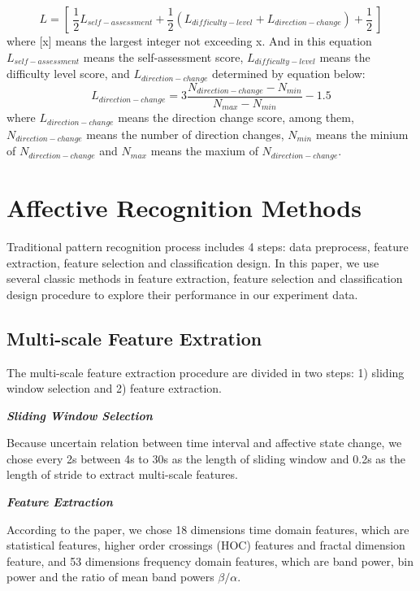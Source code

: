 \documentclass[runningheads,a4paper]{llncs}
\begin{document}
\begin{equation}
  L =  [\ \frac{1}{2}L_{self-assessment} +
      \frac{1}{2}(L_{difficulty-level} +  L_{direction-change}) + \frac{1}{2}\ ]
\end{equation}
where [x] means the largest integer not exceeding x. And in this equation \\
$L_{self-assessment}$ means the self-assessment score,
$L_{difficulty-level}$ means the difficulty level score,
and $L_{direction-change}$ determined by equation below:
\begin{equation}
   L_{direction-change} = 3\frac{N_{direction-change} -
   N_{min}}{N_{max} - N_{min}} - 1.5
\end{equation}
where $L_{direction-change}$ means the direction change score, among them,\\
$N_{direction-change}$ means the number of direction changes,
$N_{min}$ means the minium of $N_{direction-change}$ and
$N_{max}$ means the maxium of $N_{direction-change}$.

\section{Affective Recognition Methods}
Traditional pattern recognition process includes 4 steps: data preprocess,
feature extraction, feature selection and classification design. In this paper,
we use several classic methods in feature extraction, feature selection
and classification design procedure to explore their performance in
our experiment data.

\subsection{Multi-scale Feature Extration}
The multi-scale feature extraction procedure are divided in two steps:
1) sliding window selection and
2) feature extraction.

\textbf{\emph{Sliding Window Selection}}

Because uncertain relation between time interval and affective state change,
we chose every 2s between 4s to 30s as the length of sliding window and 0.2s
as the length of stride to extract multi-scale features.

\textbf{\emph{Feature Extraction}}

According to the paper\cite{Feature}, we chose 18 dimensions time domain features,
which are statistical features,
higher order crossings (HOC) features and fractal dimension feature, and 53
dimensions frequency domain features, which are band power, bin power and
the ratio of mean band powers $\beta/\alpha$.
\end{document}
